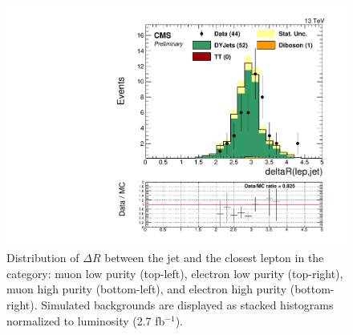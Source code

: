 \begin{figure}[h]
\begin{center}
\includegraphics[scale=0.37]{figures/control/deltaRlepjetEHP.pdf}
\caption[Distribution of $\Delta R$ between the jet and the closest lepton]{Distribution of $\Delta R$ between the jet and the closest lepton in the category: muon low purity (top-left), electron low purity (top-right), muon high purity (bottom-left), and  electron high purity (bottom-right). Simulated backgrounds are displayed as stacked histograms normalized to luminosity (2.7 fb$^{-1}$).}
\label{dRlepjet_VZ}
\end{center}
\end{figure}
